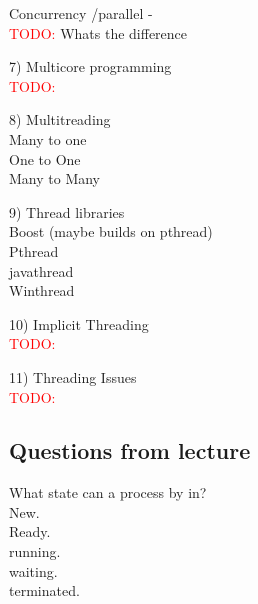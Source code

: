 \documentclass[a4paper,10pt,titlepage]{report}
\begin{document}
Concurrency /parallel - \\
\textcolor{red}{TODO:}
\hspace{10mm} Whats the difference\\
\vspace{5mm}



7) Multicore programming \\
\textcolor{red}{TODO:}
\vspace{5mm}

8) Multitreading \\
\hspace{10mm} Many to one \\
\hspace{10mm} One to One \\
\hspace{10mm} Many to Many \\	
\vspace{5mm}

9) Thread libraries \\
\hspace{10mm} Boost (maybe builds on pthread) \\
\hspace{10mm} Pthread \\
\hspace{10mm} javathread \\
\hspace{10mm} Winthread \\
\vspace{5mm}

10) Implicit Threading \\
\textcolor{red}{TODO:}
\vspace{5mm}

11) Threading Issues \\
\textcolor{red}{TODO:}
\vspace{5mm}





\newpage
\subsection{Questions from lecture}
What state can a process by in?\\
\hspace{10mm}New.\\
\hspace{10mm}Ready.\\
\hspace{10mm}running.\\
\hspace{10mm}waiting.\\
\hspace{10mm}terminated.\\
\vspace{5mm}
\end{document}
